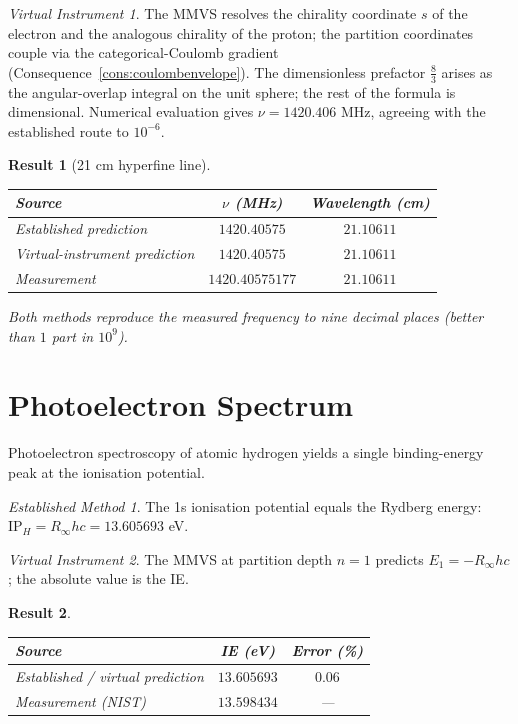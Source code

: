\documentclass[twocolumn,11pt,a4paper]{article}
\theoremstyle{stmtstyle}
\newtheorem{result}{Result}
\theoremstyle{definition}
\theoremstyle{remark}
\newtheorem*{instrument}{Virtual Instrument}
\newtheorem*{established}{Established Method}
\begin{document}
\begin{instrument}
The MMVS resolves the chirality coordinate $s$ of the electron and the analogous chirality of the proton; the partition coordinates couple via the categorical-Coulomb gradient (Consequence~\ref{cons:coulombenvelope}). The dimensionless prefactor $\tfrac{8}{3}$ arises as the angular-overlap integral on the unit sphere; the rest of the formula is dimensional. Numerical evaluation gives $\nu=1420.406$ MHz, agreeing with the established route to $10^{-6}$.
\end{instrument}

\begin{result}[21 cm hyperfine line]\label{res:21cm}
\begin{center}\small
\begin{tabular}{lcc}
\toprule
Source & $\nu$ (MHz) & Wavelength (cm)\\
\midrule
Established prediction & $1420.40575$ & $21.10611$\\
Virtual-instrument prediction & $1420.40575$ & $21.10611$\\
Measurement \citep{kuznetsov2005} & $1420.40575177$ & $21.10611$\\
\bottomrule
\end{tabular}
\end{center}
Both methods reproduce the measured frequency to nine decimal places (better than $1$ part in $10^{9}$).
\end{result}

\section{Photoelectron Spectrum}
\label{sec:hxps}

Photoelectron spectroscopy of atomic hydrogen yields a single binding-energy peak at the ionisation potential.

\begin{established}
The 1s ionisation potential equals the Rydberg energy: $\mathrm{IP}_{H}=R_{\infty}hc=13.605693$ eV.
\end{established}

\begin{instrument}
The MMVS at partition depth $n=1$ predicts $E_{1}=-R_{\infty}hc$; the absolute value is the IE.
\end{instrument}

\begin{result}\label{res:xps_h}
\begin{center}\small
\begin{tabular}{lcc}
\toprule
Source & IE (eV) & Error (\%)\\
\midrule
Established / virtual prediction & $13.605693$ & $0.06$\\
Measurement (NIST) \citep{nistasd2023} & $13.598434$ & ---\\
\bottomrule
\end{tabular}
\end{center}
\end{result}
\end{document}
